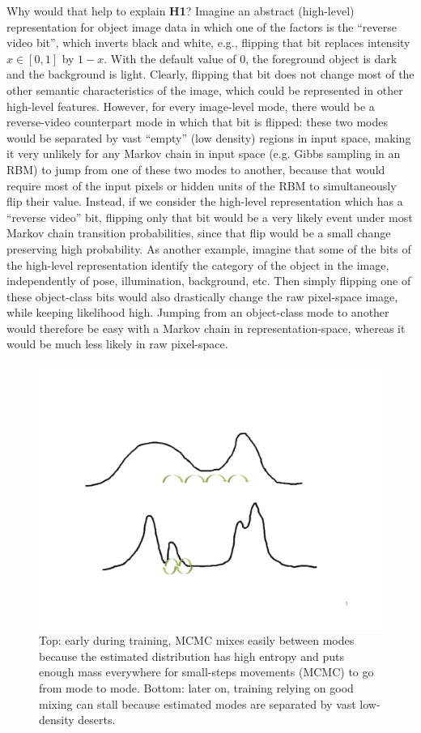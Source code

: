 Why would that help to explain {\bf H1}? Imagine an abstract (high-level)
representation for object image data in which one of the factors is the
``reverse video bit'', which inverts black and white, e.g., flipping that
bit replaces intensity $x \in [0,1]$ by $1-x$. With the default value of 0,
the foreground object is dark and the background is light.  Clearly, flipping
that bit does not change most of the other semantic characteristics of the
image, which could be represented in other high-level features. However,
for every image-level mode, there would be a reverse-video counterpart mode
in which that bit is flipped: these two modes would be separated by
vast ``empty'' (low density) regions in input space, making it very
unlikely for any Markov chain in input space (e.g. Gibbs sampling in an
RBM) to jump from one of these two modes to another, because that would require
most of the input pixels or hidden units of the RBM to simultaneously
flip their value. Instead, if we consider the high-level representation 
which has a ``reverse video''
bit, flipping only that bit would be a very likely event 
under most Markov chain transition probabilities,
since that flip would be a small change preserving high probability.
As another example, imagine that some of the bits of the high-level
representation identify the category of the object in the image, independently of pose,
illumination, background, etc. Then simply flipping one of these
object-class bits would also drastically change the raw pixel-space image,
while keeping likelihood high. Jumping from an object-class mode to another
would therefore be easy with a Markov chain in representation-space, 
whereas it would be much less likely in raw pixel-space.

\begin{figure}[!hbpt]
\centerline{\includegraphics[width=0.75\linewidth]{article3/images/mixing-problem.pdf}}
\caption[Mixing Problem]{\small Top: early during training, MCMC mixes easily between modes because the estimated
distribution has high entropy and puts enough mass everywhere for small-steps
movements (MCMC) to go from mode to mode. Bottom: later on, training relying
on good mixing can stall because estimated modes are separated by vast
low-density deserts.} \label{fig:mixing-issue}
\end{figure}


